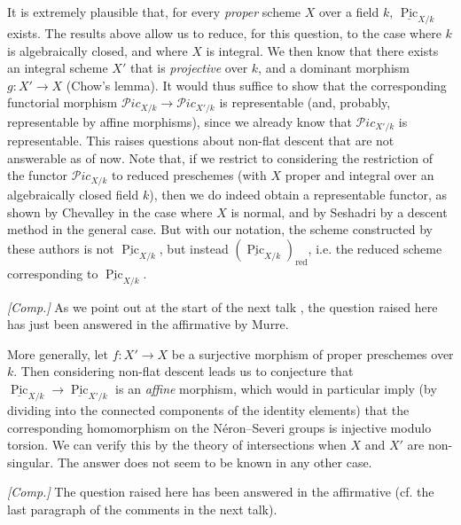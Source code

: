 \begin{remark}\label{fga3.v-6-remark-6.6}
    It is extremely plausible that, for every \emph{proper} scheme $X$ over a field $k$, $\underline{\operatorname{Pic}}_{X/k}$ exists.
    The results above allow us to reduce, for this question, to the case where $k$ is algebraically closed, and where $X$ is integral.
    We then know that there exists an integral scheme $X'$ that is \emph{projective} over $k$, and a dominant morphism $g\colon X'\to X$ (Chow's lemma).
    It would thus suffice to show that the corresponding functorial morphism $\mathcal{P}ic_{X/k}\to\mathcal{P}ic_{X'/k}$ is representable (and, probably, representable by affine morphisms), since we already know that $\mathcal{P}ic_{X'/k}$ is representable.
    This raises questions about non-flat descent that are not answerable as of now.
    Note that, if we restrict to considering the restriction of the functor $\mathcal{P}ic_{X/k}$ to reduced preschemes (with $X$ proper and integral over an algebraically closed field $k$), then we do indeed obtain a representable functor, as shown by Chevalley \cite{Che1960} in the case where $X$ is normal, and by Seshadri \cite{Ses1962} by a descent method in the general case.
    But with our notation, the scheme constructed by these authors is not $\underline{\operatorname{Pic}}_{X/k}$, but instead $(\underline{\operatorname{Pic}}_{X/k})_\mathrm{red}$, i.e. the reduced scheme corresponding to $\underline{\operatorname{Pic}}_{X/k}$.

    \emph{[Comp.]}
    As we point out at the start of the next talk , the question raised here has just been answered in the affirmative by Murre.
\end{remark}

\begin{remark}\label{fga3.v-6-remark-6.7}
    More generally, let $f\colon X'\to X$ be a surjective morphism of proper preschemes over $k$.
    Then considering non-flat descent leads us to conjecture that $\underline{\operatorname{Pic}}_{X/k}\to\underline{\operatorname{Pic}}_{X'/k}$ is an \emph{affine} morphism, which would in particular imply (by dividing into the connected components of the identity elements) that the corresponding homomorphism on the Néron–Severi groups is injective modulo torsion.
    We can verify this by the theory of intersections when $X$ and $X'$ are non-singular.
    The answer does not seem to be known in any other case.

    \emph{[Comp.]}
    The question raised here has been answered in the affirmative (cf. the last paragraph of the comments in the next talk).
\end{remark}

